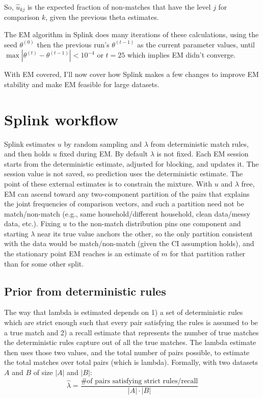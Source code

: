 \documentclass[11pt]{article}
\begin{document}
So, $\hat u_{kj}$ is the expected fraction of non-matches that have the level $j$ for comparison $k$, given the previous theta estimates.

The EM algorithm in Splink does many iterations of these calculations, using the seed $\theta^{(0)}$ then the previous run's $\theta^{(t-1)}$ as the current parameter values, until $\max | \theta^{(t)} - \theta^{(t-1)}| < 10^{-4}$ or $t=25$ which implies EM didn't converge.

With EM covered, I'll now cover how Splink makes a few changes to improve EM stability and make EM feasible for large datasets.

\section{Splink workflow}

Splink estimates $u$ by random sampling and $\lambda$ from deterministic match rules, and then holds $u$ fixed during EM. By default $\lambda$ is not fixed. Each EM session starts from the deterministic estimate, adjusted for blocking, and updates it. The session value is not saved, so prediction uses the deterministic estimate. The point of these external estimates is to constrain the mixture. With $u$ and $\lambda$ free, EM can ascend toward any two-component partition of the pairs that explains the joint frequencies of comparison vectors, and such a partition need not be match/non-match (e.g., same household/different household, clean data/messy data, etc.). Fixing $u$ to the non-match distribution pins one component and starting $\lambda$ near its true value anchors the other, so the only partition consistent with the data would be match/non-match (given the CI assumption holds), and the stationary point EM reaches is an estimate of $m$ for that partition rather than for some other split.

\subsection{Prior from deterministic rules}

The way that lambda is estimated depends on 1) a set of deterministic rules which are strict enough such that every pair satisfying the rules is assumed to be a true match and 2) a recall estimate that represents the number of true matches the deterministic rules capture out of all the true matches. The lambda estimate then uses those two values, and the total number of pairs possible, to estimate the total matches over total pairs (which is lambda). Formally, with two datasets $A$ and $B$ of size $|A|$ and $|B|$:
\[
\hat\lambda = \frac{\text{\# of pairs satisfying strict rules} / \text{recall}}{|A| \cdot |B|}
\]
\end{document}
